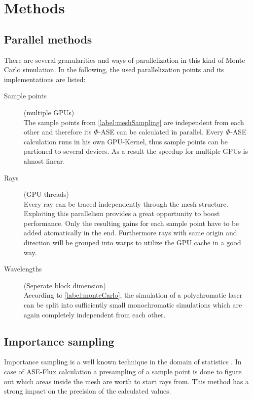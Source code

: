 \section{Methods}
\subsection{Parallel methods}
There are several granularities and ways of parallelization in this kind of 
Monte Carlo simulation. In the following, the used parallelization points and
its implementations are listed:

\begin{description}

  \item[Sample points] (multiple GPUs)\\
    The sample points from \ref{label:meshSampling} are independent from each other
    and therefore its $\Phi$-ASE can be calculated in parallel. Every $\Phi$-ASE
    calculation runs in his own GPU-Kernel, thus sample points can be partioned 
    to several devices. As a result the speedup for multiple GPUs is almost linear.

  \item[Rays] (GPU threads)\\
    Every ray can be traced independently through the mesh structure.
    Exploiting this parallelism provides a great opportunity to boost
    performance. Only the resulting gains for each sample point have to be
    added atomatically in the end.
    Furthermore rays with same origin and direction will be grouped
    into warps to utilize the GPU cache in a good way.


  \item[Wavelengths] (Seperate block dimension)\\
    According to \ref{label:monteCarlo}, the simulation of a polychromatic
    laser can be split into sufficiently small monochromatic simulations which
    are again completely independent from each other.

\end{description}


\subsection{Importance sampling}
Importance sampling is a well known technique in the domain
of statistics \cite{importanceSamplingSource}. In case of 
ASE-Flux calculation a presampling of a sample point is done
to figure out which areas inside the mesh are worth to start rays from.
This method has a strong impact on the precision of the
calculated values. 

